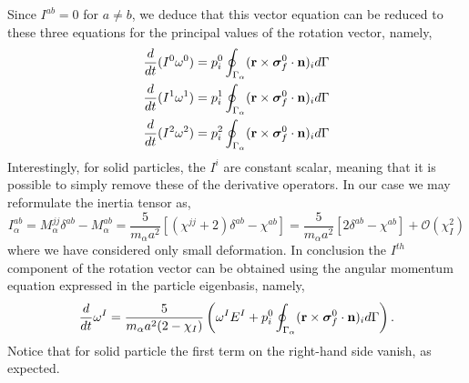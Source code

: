 Since $I^{ab} = 0$ for $a \neq b$, we deduce that this vector equation can be reduced to these three equations for the principal values of the rotation vector, namely,
\begin{align*}
    \frac{d}{dt} (I^0   \omega^0)
    = 
    p_i^0\oint_{\Gamma_{\alpha}} (\textbf{r}\times\bm\sigma_f^0\cdot \textbf{n})_i d\Gamma \\
    \frac{d}{dt} (I^1   \omega^1)
    = 
    p_i^1\oint_{\Gamma_{\alpha}} (\textbf{r}\times\bm\sigma_f^0\cdot \textbf{n})_i d\Gamma \\
    \frac{d}{dt} (I^2   \omega^2)
    = 
    p_i^2\oint_{\Gamma_{\alpha}} (\textbf{r}\times\bm\sigma_f^0\cdot \textbf{n})_i d\Gamma 
\end{align*}
Interestingly, for solid particles, the $I^i$ are constant scalar, meaning that it is possible to simply remove these of the derivative operators. 
In our case we may reformulate the inertia tensor as, 
\begin{equation*}
    I^{ab}_\alpha
    = 
    M^{jj}_\alpha \delta^{ab}
    - M^{ab}_\alpha
    = 
    \frac{5}{m_\alpha a^2}[(\chi^{jj} + 2) \delta^{ab}
    - \chi^{ab}]
    = 
    \frac{5}{m_\alpha a^2}[2\delta^{ab} - \chi^{ab}]
    + \mathcal{O}(\chi_I^2)
\end{equation*}
where we have considered only small deformation. 
In conclusion the $I^{th}$ component of the rotation vector can be obtained using the angular momentum equation expressed in the particle eigenbasis, namely, 
\begin{align*}
    \frac{d}{dt}\omega^I 
    = 
    \frac{5}{m_\alpha a^2 (2 - \chi_I)}
    \left(
    \omega^I E^I 
    +
    p_i^0\oint_{\Gamma_{\alpha}} (\textbf{r}\times\bm\sigma_f^0\cdot \textbf{n})_i d\Gamma 
    \right). 
\end{align*}
Notice that for solid particle the first term on the right-hand side vanish, as expected. 